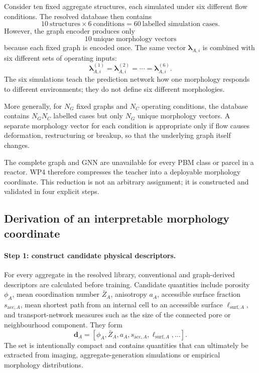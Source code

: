 \documentclass[11pt,a4paper]{article}
\begin{document}
Consider ten fixed aggregate structures, each simulated under six different
flow conditions. The resolved database then contains
\begin{equation}
  10\ \text{structures}\times6\ \text{conditions}
  =60\ \text{labelled simulation cases}.
\end{equation}
However, the graph encoder produces only
\begin{equation}
  \boxed{10\ \text{unique morphology vectors}}
\end{equation}
because each fixed graph is encoded once. The same vector
\(\boldsymbol{\lambda}_{A,i}\) is combined with six different sets of
operating inputs:
\begin{equation}
  \boldsymbol{\lambda}_{A,i}^{(1)}
  =\boldsymbol{\lambda}_{A,i}^{(2)}
  =\cdots
  =\boldsymbol{\lambda}_{A,i}^{(6)}.
\end{equation}
The six simulations teach the prediction network how one morphology responds
to different environments; they do not define six different morphologies.

More generally, for \(N_G\) fixed graphs and \(N_C\) operating conditions, the
database contains \(N_GN_C\) labelled cases but only \(N_G\) unique morphology
vectors. A separate morphology vector for each condition is appropriate only
if flow causes deformation, restructuring or breakup, so that the underlying
graph itself changes.

The complete graph and GNN are unavailable for every PBM class or parcel in a
reactor. WP4 therefore compresses the teacher into a deployable morphology
coordinate. This reduction is not an arbitrary assignment; it is constructed
and validated in four explicit steps.

\subsection{Derivation of an interpretable morphology coordinate}

\paragraph{Step 1: construct candidate physical descriptors.}
For every aggregate in the resolved library, conventional and graph-derived
descriptors are calculated before training. Candidate quantities include
porosity \(\phi_A\), mean coordination number \(\bar Z_A\), anisotropy
\(a_A\), accessible surface fraction \(s_{\mathrm{acc},A}\), mean shortest
path from an internal cell to an accessible surface
\(\ell_{\mathrm{surf},A}\), and transport-network measures such as the size of
the connected pore or neighbourhood component. They form
\begin{equation}
  \boldsymbol{d}_A=
  \left[
  \phi_A,\bar Z_A,a_A,s_{\mathrm{acc},A},
  \ell_{\mathrm{surf},A},\ldots
  \right].
  \label{eq:descriptor_vector}
\end{equation}
The set is intentionally compact and contains quantities that can ultimately
be extracted from imaging, aggregate-generation simulations or empirical
morphology distributions.
\end{document}
